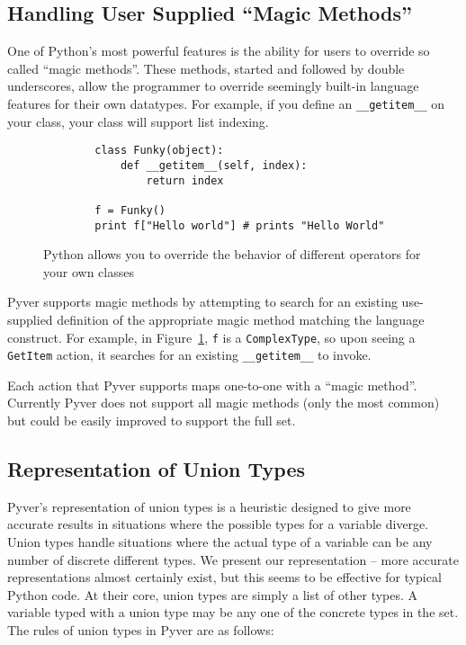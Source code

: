 \documentclass{article}[12pt]
\begin{document}
\subsection{Handling User Supplied ``Magic Methods''}
One of Python's most powerful features is the ability for users to override so called ``magic methods''. These methods,
started and followed by double underscores, allow the programmer to override seemingly built-in language features for
their own datatypes. For example, if you define an \texttt{\_\_getitem\_\_} on your class, your class will support list
indexing.
\begin{figure}
    \begin{verbatim}
        class Funky(object):
            def __getitem__(self, index):
                return index

        f = Funky()
        print f["Hello world"] # prints "Hello World"
    \end{verbatim}
    \caption{Python allows you to override the behavior of different operators for your own classes}
    \label{fig:magicmethods}
\end{figure}

Pyver supports magic methods by attempting to search for an existing use-supplied definition of the appropriate magic
method matching the language construct. For example, in Figure~\ref{fig:magicmethods}, \texttt{f} is a \texttt{ComplexType}, so upon seeing a
\texttt{GetItem} action, it searches for an existing \texttt{\_\_getitem\_\_} to invoke.
  
Each action that Pyver supports maps one-to-one with a ``magic method''. Currently Pyver does not support all magic
methods (only the most common) but could be easily improved to support the full set.

\subsection{Representation of Union Types}

Pyver's representation of union types is a heuristic designed to give more accurate results in
situations where the possible types for a variable diverge. Union types handle situations where the
actual type of a variable can be any number of discrete different types. We present our
representation -- more accurate representations almost certainly exist, but this seems to be
effective for typical Python code. At their core, union types are simply a list of other types. A
variable typed with a union type may be any one of the concrete types in the set. The rules of union types in
Pyver are as follows:
\end{document}
